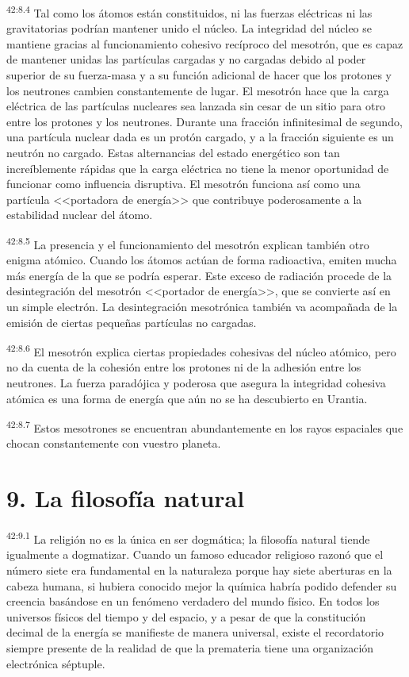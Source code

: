 \par
\textsuperscript{42:8.4} Tal como los átomos están constituidos, ni las fuerzas eléctricas ni las gravitatorias podrían mantener unido el núcleo. La integridad del núcleo se mantiene gracias al funcionamiento cohesivo recíproco del mesotrón, que es capaz de mantener unidas las partículas cargadas y no cargadas debido al poder superior de su fuerza-masa y a su función adicional de hacer que los protones y los neutrones cambien constantemente de lugar. El mesotrón hace que la carga eléctrica de las partículas nucleares sea lanzada sin cesar de un sitio para otro entre los protones y los neutrones. Durante una fracción infinitesimal de segundo, una partícula nuclear dada es un protón cargado, y a la fracción siguiente es un neutrón no cargado. Estas alternancias del estado energético son tan increíblemente rápidas que la carga eléctrica no tiene la menor oportunidad de funcionar como influencia disruptiva. El mesotrón funciona así como una partícula <<portadora de energía>> que contribuye poderosamente a la estabilidad nuclear del átomo.

\par
\textsuperscript{42:8.5} La presencia y el funcionamiento del mesotrón explican también otro enigma atómico. Cuando los átomos actúan de forma radioactiva, emiten mucha más energía de la que se podría esperar. Este exceso de radiación procede de la desintegración del mesotrón <<portador de energía>>, que se convierte así en un simple electrón. La desintegración mesotrónica también va acompañada de la emisión de ciertas pequeñas partículas no cargadas.

\par
\textsuperscript{42:8.6} El mesotrón explica ciertas propiedades cohesivas del núcleo atómico, pero no da cuenta de la cohesión entre los protones ni de la adhesión entre los neutrones. La fuerza paradójica y poderosa que asegura la integridad cohesiva atómica es una forma de energía que aún no se ha descubierto en Urantia.

\par
\textsuperscript{42:8.7} Estos mesotrones se encuentran abundantemente en los rayos espaciales que chocan constantemente con vuestro planeta.

\section*{9. La filosofía natural}
\par
\textsuperscript{42:9.1} La religión no es la única en ser dogmática; la filosofía natural tiende igualmente a dogmatizar. Cuando un famoso educador religioso razonó que el número siete era fundamental en la naturaleza porque hay siete aberturas en la cabeza humana, si hubiera conocido mejor la química habría podido defender su creencia basándose en un fenómeno verdadero del mundo físico. En todos los universos físicos del tiempo y del espacio, y a pesar de que la constitución decimal de la energía se manifieste de manera universal, existe el recordatorio siempre presente de la realidad de que la premateria tiene una organización electrónica séptuple.


